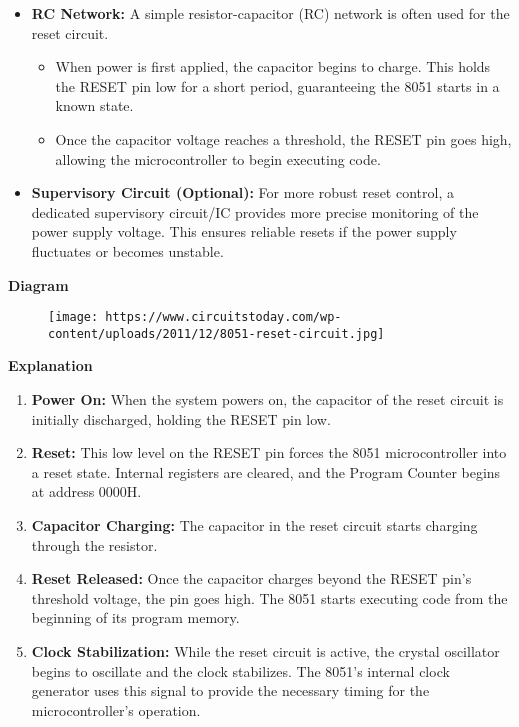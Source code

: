 \documentclass[
]{article}
\begin{document}
\begin{itemize}
\item
  \textbf{RC Network:} A simple resistor-capacitor (RC) network is often
  used for the reset circuit.

  \begin{itemize}
  \item
    When power is first applied, the capacitor begins to charge. This
    holds the RESET pin low for a short period, guaranteeing the 8051
    starts in a known state.
  \item
    Once the capacitor voltage reaches a threshold, the RESET pin goes
    high, allowing the microcontroller to begin executing code.
  \end{itemize}
\item
  \textbf{Supervisory Circuit (Optional):} For more robust reset
  control, a dedicated supervisory circuit/IC provides more precise
  monitoring of the power supply voltage. This ensures reliable resets
  if the power supply fluctuates or becomes unstable.
\end{itemize}

\textbf{Diagram}

\begin{figure}
\centering
\texttt{[image: https://www.circuitstoday.com/wp-content/uploads/2011/12/8051-reset-circuit.jpg]}
\caption{}
\end{figure}

\textbf{Explanation}

\begin{enumerate}
\def\labelenumi{\arabic{enumi}.}
\item
  \textbf{Power On:} When the system powers on, the capacitor of the
  reset circuit is initially discharged, holding the RESET pin low.
\item
  \textbf{Reset:} This low level on the RESET pin forces the 8051
  microcontroller into a reset state. Internal registers are cleared,
  and the Program Counter begins at address 0000H.
\item
  \textbf{Capacitor Charging:} The capacitor in the reset circuit starts
  charging through the resistor.
\item
  \textbf{Reset Released:} Once the capacitor charges beyond the RESET
  pin's threshold voltage, the pin goes high. The 8051 starts executing
  code from the beginning of its program memory.
\item
  \textbf{Clock Stabilization:} While the reset circuit is active, the
  crystal oscillator begins to oscillate and the clock stabilizes. The
  8051's internal clock generator uses this signal to provide the
  necessary timing for the microcontroller's operation.
\end{enumerate}
\end{document}

